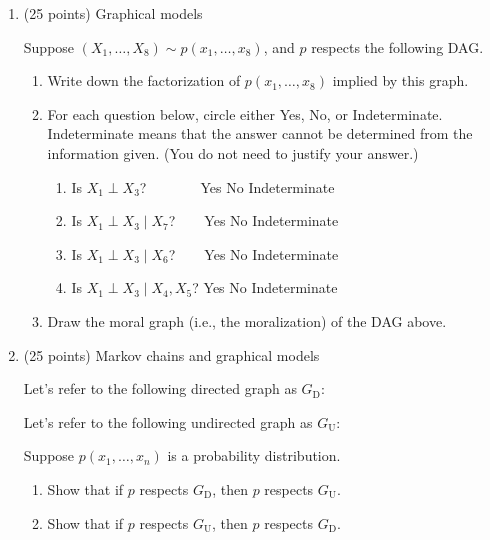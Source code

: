 \documentclass[12pt]{article}
\begin{document}
\normalsize
\begin{enumerate}

\newpage
\item (25 points) Graphical models

Suppose $(X_1,\ldots,X_8)\sim p(x_1,\ldots,x_8)$, and $p$ respects the following DAG.

\begin{enumerate}
\item Write down the factorization of $p(x_1,\ldots,x_8)$ implied by this graph.
\vspace{8em}
\item For each question below, circle either Yes, No, or Indeterminate. Indeterminate means that the answer cannot be determined from the information given.  (You do not need to justify your answer.)
\vspace{1em}
\begin{enumerate}
\setlength\itemsep{1em}
\item Is $X_1 \perp X_3$? $\phantom{\mid X_4,X_5}$ \hspace{1cm}  Yes \hspace{1cm} No \hspace{1cm} Indeterminate
\item Is $X_1 \perp X_3 \mid X_7$? $\phantom{\,X_7}$ \hspace{1cm}  Yes \hspace{1cm} No \hspace{1cm} Indeterminate
\item Is $X_1 \perp X_3 \mid X_6$? $\phantom{\,X_6}$ \hspace{1cm}  Yes \hspace{1cm} No \hspace{1cm} Indeterminate
\item Is $X_1 \perp X_3 \mid X_4,X_5$? \hspace{1cm}  Yes \hspace{1cm} No \hspace{1cm} Indeterminate
\end{enumerate}
\vspace{2em}
\item Draw the moral graph (i.e., the moralization) of the DAG above.
\end{enumerate}


\newpage
\item (25 points) Markov chains and graphical models

Let's refer to the following directed graph as $G_\text{D}$:

Let's refer to the following undirected graph as $G_\text{U}$:

Suppose $p(x_1,\ldots,x_n)$ is a probability distribution.
\begin{enumerate}
\item Show that if $p$ respects $G_\text{D}$, then $p$ respects $G_\text{U}$.
\vspace{15em}
\item Show that if $p$ respects $G_\text{U}$, then $p$ respects $G_\text{D}$.
\end{enumerate}



\end{enumerate}
\end{document}
